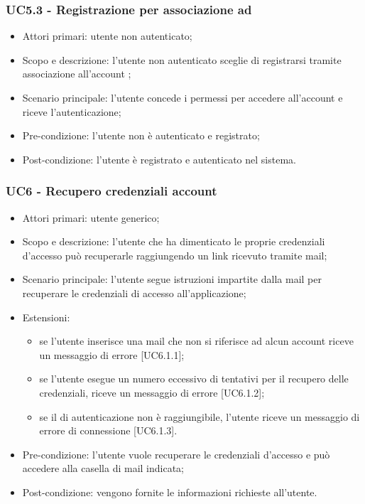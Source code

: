 \subsubsection{UC5.3 - Registrazione per associazione ad }
\begin{itemize}
	\item  Attori primari: utente non autenticato;
	\item  Scopo e descrizione: l'utente non autenticato sceglie di registrarsi tramite associazione all'account \markg{Amazon};
	\item  Scenario principale: l'utente concede i permessi per accedere all'account  e riceve l'autenticazione;
	\item  Pre-condizione: l'utente non è autenticato e registrato;
	\item  Post-condizione: l'utente è registrato e autenticato nel sistema.
\end{itemize}
\subsubsection{UC6 - Recupero credenziali account}
\begin{itemize}
	\item  Attori primari: utente generico;
	\item  Scopo e descrizione: l'utente che ha dimenticato le proprie credenziali d'accesso può recuperarle raggiungendo un link ricevuto tramite mail;
	\item  Scenario principale: l'utente segue istruzioni impartite dalla mail per recuperare le credenziali di accesso all'applicazione;
	\item  Estensioni: 
		   \begin{itemize}
				\item se l'utente inserisce una mail che non si riferisce ad alcun account riceve un messaggio di errore [UC6.1.1];
				\item se l'utente esegue un numero eccessivo di tentativi per il recupero delle credenziali, riceve un messaggio di errore [UC6.1.2];
				\item se il  di autenticazione non è raggiungibile, l'utente riceve un messaggio di errore di connessione [UC6.1.3].
		   \end{itemize}
	\item  Pre-condizione: l'utente vuole recuperare le credenziali d'accesso e può accedere alla casella di mail indicata;
	\item  Post-condizione: vengono fornite le informazioni richieste all'utente.
\end{itemize}
